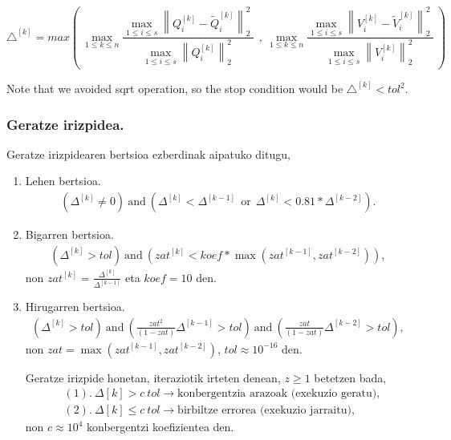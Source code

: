 \begin{enumerate}
\begin{equation}
 \triangle^{[k]}=max\left({\  {{\max }_{1\le k\le n} \frac{{{\max }_{1\le i\le s} {\left\|Q^{[k]}_i-{\tilde{Q}}^{[k]}_i\right\|}^2_2\ }}{{{\max }_{1\le i\le s} {\left\|Q^{[k]}_i\right\|}^2_2\ }}\ }\ },\ {{\max }_{1\le k\le n} \frac{{{\max }_{1\le i\le s} {\left\|V^{[k]}_i-{\tilde{V}}^{[k]}_i\right\|}^2_2\ }}{{{\max }_{1\le i\le s} {\left\|V^{[k]}_i\right\|}^2_2\ }}\ }\right)
\end{equation}

Note that we avoided sqrt operation, so the stop condition would be $\triangle^{[k]} <tol^2$.


\end{enumerate} 


\subsubsection*{Geratze irizpidea.}

Geratze irizpidearen bertsioa ezberdinak aipatuko ditugu,

\begin{enumerate}
\item Lehen bertsioa.
\begin{align*}
(\Delta^{[k]} \neq 0) \ \text{and} \ ( \Delta^{[k]}< \Delta^{[k-1]} \ \ \text{or} \ \ \Delta^{[k]}< 0.81*\Delta^{[k-2]}).
\end{align*}

\item Bigarren bertsioa.
\begin{align*}
\left(\Delta^{[k]} > tol \right) \ \text{and} \ \left( zat^{[k]}  < koef*\max(zat^{[k-1]},zat^{[k-2]}) \right),
\end{align*}
non $zat^{[k]}=\frac{\Delta^{[k]}}{\Delta^{[k-1]}}$ eta $koef=10$ den.

\item Hirugarren bertsioa.
\begin{align*}
\left(\Delta^{[k]} > tol\right) \ \text{and} \ \left(\frac{zat^2}{(1-zat)} \Delta^{[k-1]}>tol\right) \ \text{and} \ \left(\frac{zat}{(1-zat)}\Delta^{[k-2]}>tol\right),
\end{align*}
non $zat=\max(zat^{[k-1]},zat^{[k-2]})$, $tol\approx10^{-16}$ den.

Geratze irizpide honetan, iteraziotik irteten denean, $z\geqslant1$ betetzen bada,
\begin{align*}
&(1). \ \Delta {[k]} > c \ tol \rightarrow \text{konbergentzia arazoak (exekuzio geratu)},\\
&(2). \ \Delta {[k]} \leqslant c \ tol \rightarrow \text{birbiltze errorea (exekuzio jarraitu)},
\end{align*}   
non $c\approx 10^{4}$ konbergentzi koefizientea den. 
\end{enumerate}

